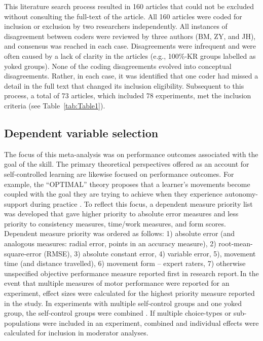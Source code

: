 \documentclass[man,floatsintext,hidelinks]{apa7}
\begin{document}
This literature search process resulted in 160 articles that could not be excluded without consulting the full-text of the article. All 160 articles were coded for inclusion or exclusion by two researchers independently. All instances of disagreement between coders were reviewed by three authors (BM, ZY, and JH), and consensus was reached in each case. Disagreements were infrequent and were often caused by a lack of clarity in the articles (e.g., 100\%-KR groups labelled as yoked groups). None of the coding disagreements evolved into conceptual disagreements. Rather, in each case, it was identified that one coder had missed a detail in the full text that changed its inclusion eligibility. Subsequent to this process, a total of 73 articles, which included 78 experiments, met the inclusion criteria (see Table~\ref{tab:Table1}). 

\subsection{Dependent variable selection}
The focus of this meta-analysis was on performance outcomes associated with the goal of the skill. The primary theoretical perspectives offered as an account for self-controlled learning are likewise focused on performance outcomes. For example, the ``OPTIMAL'' theory proposes that a learner's movements become coupled with the goal they are trying to achieve when they experience autonomy-support during practice \parencite{Wulf2016-gf}. To reflect this focus, a dependent measure priority list was developed that gave higher priority to absolute error measures and less priority to consistency measures, time/work measures, and form scores. Dependent measure priority was ordered as follows: 1) absolute error (and analogous measures: radial error, points in an accuracy measure), 2) root-mean-square-error (RMSE), 3) absolute constant error, 4) variable error, 5), movement time (and distance travelled), 6) movement form – expert raters, 7) otherwise unspecified objective performance measure reported first in research report.\footnotemark \,In the event that multiple measures of motor performance were reported for an experiment, effect sizes were calculated for the highest priority measure reported in the study. In experiments with multiple self-control groups and one yoked group, the self-control groups were combined \parencite{Higgins2011-rg}. If multiple choice-types or sub-populations were included in an experiment, combined and individual effects were calculated for inclusion in moderator analyses.
\end{document}
